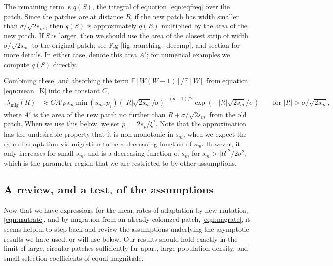 \documentclass{article}
\newcommand{\linelabel}[1]{}
\newcommand{\E}{\mathbb{E}}
\newcommand{\migrate}{\lambda_\text{mig}}
\newcommand{\secref}[1]{{\emph{\nameref{#1}}}}
\begin{document}
The remaining term is $q(S)$, the integral of equation \eqref{eqn:eqfreq} over the patch.
Since the patches are at distance $R$,
if the new patch has width smaller than $\sigma/\sqrt{2s_m}$, 
then $q(S)$ is approximately $q(R)$ multiplied by the area of the new patch.
If $S$ is larger, then we should use the area of the closest strip
of width $\sigma/\sqrt{2s_m}$ to the original patch;
see Fig \ref{fig:branching_decomp}, and section \secref{apx:qS} for more details.
In either case, denote this area $A'$;
for numerical examples we compute $q(S)$ directly.


Combining these, and absorbing the term $\E[W(W-1)]/\E[W]$ from equation \eqref{eqn:mean_K} 
into the constant $C$,
\begin{align} \label{eqn:migrate}
  \migrate(R) &\approx C A' \rho s_m \min(s_m,p_e) \left( |R| \sqrt{2 s_m}/\sigma \right)^{-(d-1)/2} \exp( - |R| \sqrt{2 s_m} / \sigma)  \qquad \text{for } |R| > \sigma/\sqrt{2 s_m}  ,
\end{align}
where $A'$ is the area of the new patch no further than $R+\sigma/\sqrt{2s_m}$
from the old patch.
When we use this below, we set $p_e = 2 s_p / \xi^2$.
Note that the approximation has the undesirable property that it is
non-monotonic in $s_m$, when we expect the rate of adaptation via
migration to be a decreasing function of $s_m$. However, it only increases for small $s_m$, 
and is a decreasing function of $s_m$ for $s_m > |R|^2 / 2 \sigma^2$, 
which is the parameter region that we are restricted to by other assumptions.
\linelabel{rr:sm_condition}


\subsection{A review, and a test, of the assumptions}
\label{ss:assumptions}

Now that we have expressions for the mean rates of adaptation by new mutation, \eqref{eqn:mutrate},
and by migration from an already colonized patch, \eqref{eqn:migrate},
it seems helpful to step back and review the assumptions 
underlying the asymptotic results we have used, or will use below.
Our results should hold exactly in the limit of 
large, circular patches sufficiently far apart,
large population density,
and small selection coefficients of equal magnitude.
\end{document}
